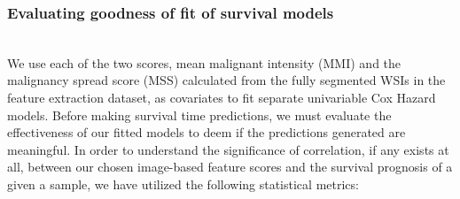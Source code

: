 \documentclass{l4proj}
\begin{document}
\subsubsection{Evaluating goodness of fit of survival models}\hfill\\
We use each of the two scores, mean malignant intensity (MMI) and the malignancy spread score (MSS) calculated from the fully segmented WSIs in the feature extraction dataset, as covariates to fit separate univariable Cox Hazard models. Before making survival time predictions, we must evaluate the effectiveness of our fitted models to deem if the predictions generated are meaningful. In order to understand the significance of correlation, if any exists at all, between our chosen image-based feature scores and the survival prognosis of a given a sample,  we have utilized the following statistical metrics:
\end{document}
